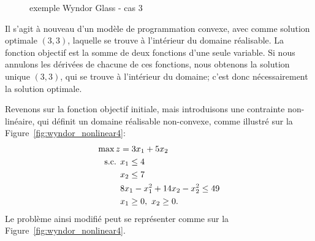 \begin{example}
\begin{figure}[htbp]
\begin{center}
\end{center}
\caption{exemple Wyndor Glass - cas 3}
\label{fig:wyndor_nonlinear3}
\end{figure}
Il s'agit à nouveau d'un modèle de programmation convexe, avec comme solution optimale $(3,3)$, laquelle se trouve à l'intérieur du domaine réalisable.
La fonction objectif est la somme de deux fonctions d'une seule variable.
Si nous annulons les dérivées de chacune de ces fonctions, nous obtenons la solution unique $(3,3)$, qui se trouve à l'intérieur du domaine; c'est donc nécessairement la solution optimale.

Revenons sur la fonction objectif initiale, mais introduisons une contrainte non-linéaire, qui définit un domaine réalisable non-convexe, comme illustré sur la Figure~\ref{fig:wyndor_nonlinear4}:
\begin{align*}
\max z &= 3x_1 + 5x_2 \\
\mbox{s.c. } & x_1 \leq 4 \\
& x_2 \leq 7 \\
& 8x_1-x_1^2+14x_2-x_2^2 \leq 49 \\
& x_1 \geq 0,\ x_2 \geq 0.
\end{align*}
Le problème ainsi modifié peut se représenter comme sur la Figure~\ref{fig:wyndor_nonlinear4}.
\begin{figure}[htbp]
\begin{center}
\end{center}
\end{figure}
\end{example}
